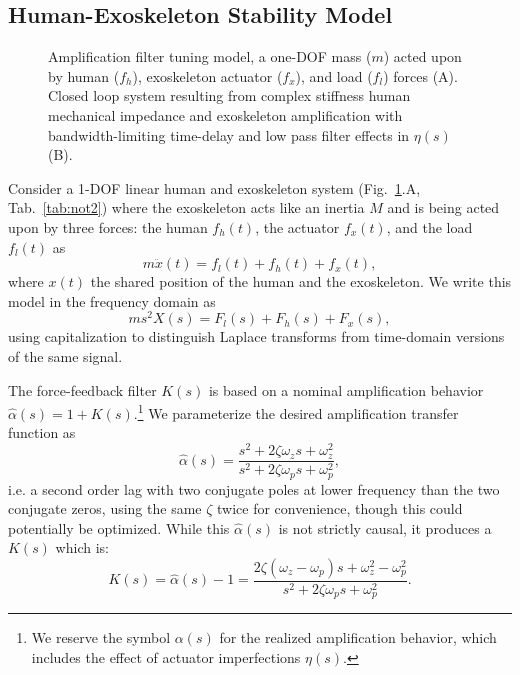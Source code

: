 \documentclass[utf8]{frontiersSCNS}
\begin{document}
\subsection{Human-Exoskeleton Stability Model}
\begin{figure}[]
	\def\svgwidth{\textwidth}
	{
		}

\caption{Amplification filter tuning model, a one-DOF mass ($m$) acted upon by human ($f_h$), exoskeleton actuator ($f_x$), and load ($f_l$) forces (A). Closed loop system resulting from complex stiffness human mechanical impedance and exoskeleton amplification with bandwidth-limiting time-delay and low pass filter effects in $\eta(s)$ (B).}
	\label{fig:block_diagrams}
\end{figure}

Consider a 1-DOF linear human and exoskeleton system (Fig.~\ref{fig:block_diagrams}.A, Tab.~\ref{tab:not2}) where the exoskeleton acts like an inertia $M$ and is being acted upon by three forces: the human $f_h(t)$, the actuator $f_x(t)$, and the load $f_l(t)$ as
\begin{equation}
m \ddot x(t) = f_l(t)+f_h(t)+f_x(t),
\end{equation}
where $x(t)$ the shared position of the human and the exoskeleton. We write this model in the frequency domain as
\begin{equation}
m s^2 X(s) = F_l(s)+F_h(s)+F_x(s),
\end{equation}
using capitalization to distinguish Laplace transforms from time-domain versions of the same signal.

The force-feedback filter $K(s)$ is based on a nominal amplification behavior $\widehat \alpha(s) = 1+K(s)$.\footnote{We reserve the symbol $\alpha(s)$ for the realized amplification behavior, which includes the effect of actuator imperfections $\eta(s)$.}
We parameterize the desired amplification transfer function as
\begin{equation}
\widehat\alpha(s) = \frac{s^2 + 2\zeta \omega_z s + \omega_z^2}{s^2 + 2\zeta \omega_p s + \omega_p^2},
\end{equation}
i.e. a second order lag with two conjugate poles at lower frequency than the two conjugate zeros, using the same $\zeta$ twice for convenience, though this could potentially be optimized. 
While this $\widehat\alpha(s)$ is not strictly causal, it produces a $K(s)$ which is:
\begin{equation}
K(s) = \widehat\alpha(s)-1 = \frac{2\zeta (\omega_z-\omega_p) s + \omega_z^2-\omega_p^2}{s^2 + 2\zeta \omega_p s + \omega_p^2}.
\end{equation}
\end{document}
